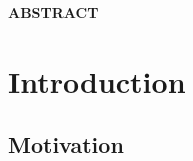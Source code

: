 \documentclass[10pt]{report}
\begin{document}
\vfill





\newpage


\thispagestyle{empty}
 \begin{center}\huge \bfseries  {ABSTRACT} \\[1.5cm]\end{center}  
\par 
 


\newpage


\clearpage

\newpage
\thispagestyle{empty}
 
\thispagestyle{empty}
\tableofcontents
\thispagestyle{empty}
 
\listoffigures
 
\listoftables
 \newpage

\clearpage
{}
\setcounter{page}{1}
\chapter{Introduction}
 



\section{Motivation}
\end{document}

